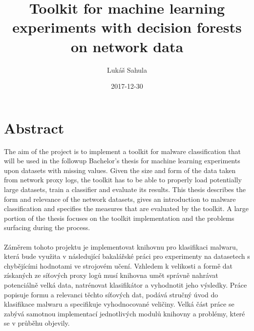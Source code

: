 \documentclass{article}
\title{Toolkit for machine learning experiments with decision forests on network data}
\date{2017-12-30}
\author{Lukáš Sahula}
\begin{document}
  \maketitle
  \newpage
  \section*{Abstract}
    The aim of the project is to implement a toolkit for malware classification that will be used in the followup Bachelor's thesis for machine learning experiments upon datasets with missing values. Given the size and form of the data taken from network proxy logs, the toolkit has to be able to properly load potentially large datasets, train a classifier and evaluate its results. This thesis describes the form and relevance of the network datasets, gives an introduction to malware classification and specifies the measures that are evaluated by the toolkit. A large portion of the thesis focuses on the toolkit implementation and the problems surfacing during the process.
    \\~\\
    Záměrem tohoto projektu je implementovat knihovnu pro klasifikaci malwaru, která bude využita v následující bakalářské práci pro experimenty na datasetech s chybějícími hodnotami ve strojovém učení. Vzhledem k velikosti a formě dat získaných ze síťových proxy logů musí knihovna umět správně nahrávat potenciálně velká data, natrénovat klasifikátor a vyhodnotit jeho výsledky. Práce popisuje formu a relevanci těchto síťových dat, podává stručný úvod do klasifikace malwaru a specifikuje vyhodnocované veličiny. Velká část práce se zabývá samotnou implementací jednotlivých modulů knihovny a problémy, které se v průběhu objevily.
  \newpage
  \tableofcontents
  \newpage
\end{document}
